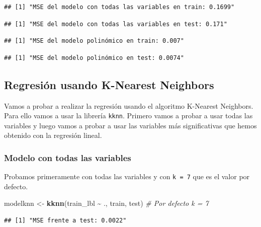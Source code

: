 \documentclass[
]{article}
\newenvironment{Shaded}{\begin{snugshade}}{\end{snugshade}}
\newcommand{\CommentTok}[1]{\textcolor[rgb]{0.56,0.35,0.01}{\textit{#1}}}
\newcommand{\FunctionTok}[1]{\textcolor[rgb]{0.13,0.29,0.53}{\textbf{#1}}}
\newcommand{\NormalTok}[1]{#1}
\newcommand{\OtherTok}[1]{\textcolor[rgb]{0.56,0.35,0.01}{#1}}
\newcommand{\SpecialCharTok}[1]{\textcolor[rgb]{0.81,0.36,0.00}{\textbf{#1}}}
\begin{document}
\begin{verbatim}
## [1] "MSE del modelo con todas las variables en train: 0.1699"
\end{verbatim}

\begin{verbatim}
## [1] "MSE del modelo con todas las variables en test: 0.171"
\end{verbatim}

\begin{verbatim}
## [1] "MSE del modelo polinómico en train: 0.007"
\end{verbatim}

\begin{verbatim}
## [1] "MSE del modelo polinómico en test: 0.0074"
\end{verbatim}

\hypertarget{regresiuxf3n-usando-k-nearest-neighbors}{%
\subsection{Regresión usando K-Nearest
Neighbors}\label{regresiuxf3n-usando-k-nearest-neighbors}}

Vamos a probar a realizar la regresión usando el algoritmo K-Nearest
Neighbors. Para ello vamos a usar la librería \texttt{kknn}. Primero
vamos a probar a usar todas las variables y luego vamos a probar a usar
las variables más significativas que hemos obtenido con la regresión
lineal.

\hypertarget{modelo-con-todas-las-variables}{%
\subsubsection{Modelo con todas las
variables}\label{modelo-con-todas-las-variables}}

Probamos primeramente con todas las variables y con \texttt{k\ =\ 7} que
es el valor por defecto.

\begin{Shaded}
\begin{Highlighting}[]
\NormalTok{modelknn }\OtherTok{\textless{}{-}} \FunctionTok{kknn}\NormalTok{(train\_lbl }\SpecialCharTok{\textasciitilde{}}\NormalTok{ ., train, test) }\CommentTok{\# Por defecto k = 7}
\end{Highlighting}
\end{Shaded}

\begin{verbatim}
## [1] "MSE frente a test: 0.0022"
\end{verbatim}
\end{document}
